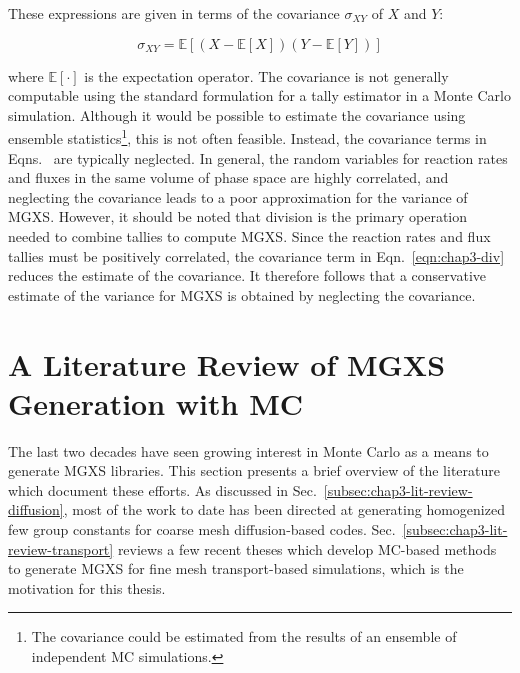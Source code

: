 \vspace{-0.4in}

\noindent These expressions are given in terms of the covariance $\sigma_{XY}$ of $X$ and $Y$:

\vspace{-0.1in}

\begin{equation}
\label{eqn:chap3-covariance}
\sigma_{XY} = \mathbb{E}[(X - \mathbb{E}[X])(Y - \mathbb{E}[Y])]
\end{equation}

\noindent where $\mathbb{E}[\cdot]$ is the expectation operator. The covariance is not generally computable using the standard formulation for a tally estimator in a Monte Carlo simulation. Although it would be possible to estimate the covariance using ensemble statistics\footnote{The covariance could be estimated from the results of an ensemble of independent \ac{MC} simulations.}, this is not often feasible. Instead, the covariance terms in Eqns.~ are typically neglected. In general, the random variables for reaction rates and fluxes in the same volume of phase space are highly correlated, and neglecting the covariance leads to a poor approximation for the variance of \ac{MGXS}. However, it should be noted that division is the primary operation needed to combine tallies to compute \ac{MGXS}. Since the reaction rates and flux tallies must be positively correlated, the covariance term in Eqn.~\ref{eqn:chap3-div} reduces the estimate of the covariance. It therefore follows that a conservative estimate of the variance for \ac{MGXS} is obtained by neglecting the covariance.


\section{A Literature Review of MGXS Generation with MC}
\label{sec:chap3-lit-review}

The last two decades have seen growing interest in Monte Carlo as a means to generate \ac{MGXS} libraries. This section presents a brief overview of the literature which document these efforts. As discussed in Sec.~\ref{subsec:chap3-lit-review-diffusion}, most of the work to date has been directed at generating homogenized few group constants for coarse mesh diffusion-based codes. Sec.~\ref{subsec:chap3-lit-review-transport} reviews a few recent theses which develop \ac{MC}-based methods to generate \ac{MGXS} for fine mesh transport-based simulations, which is the motivation for this thesis.


